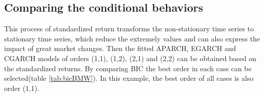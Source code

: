 

\subsection{Comparing the conditional behaviors}

This process of standardized return transforms the non-stationary time series to stationary time series, which reduce the extremely values and can also express the impact of great market changes. Then the fitted APARCH, EGARCH and CGARCH models of orders (1,1), (1,2), (2,1) and (2,2) can be obtained based on the standardized returns. By comparing BIC the best order in each case can be selected(table \ref{tab:bicBMW}). In this example, the best order of all cases is also order (1,1).








